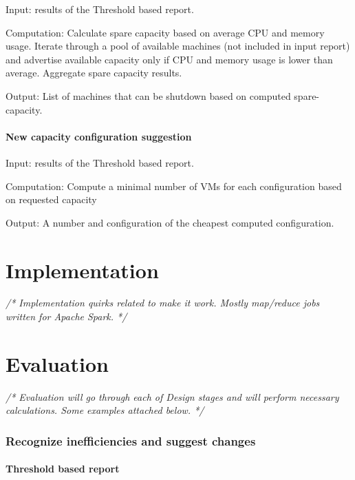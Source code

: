 \documentclass[]{final_report}
\begin{document}
Input: results of the Threshold based report. 

Computation: Calculate spare capacity based on average CPU and memory usage. Iterate through a pool of available machines (not included in input report) and advertise available capacity only if CPU and memory usage is lower than average. Aggregate spare capacity results.

Output: List of machines that can be shutdown based on computed spare-capacity.

\subsubsection{New capacity configuration suggestion}

Input: results of the Threshold based report.

Computation: Compute a minimal number of VMs for each configuration based on requested capacity

Output: A number and configuration of the cheapest computed configuration.


\chapter{Implementation}

\emph{/* Implementation quirks related to make it work. Mostly map/reduce jobs written for Apache Spark. */}


\chapter{Evaluation}

\emph{/* Evaluation will go through each of Design stages and will perform necessary calculations. Some examples attached below. */}

\subsection{Recognize inefficiencies and suggest changes}

\subsubsection{Threshold based report}
\end{document}
